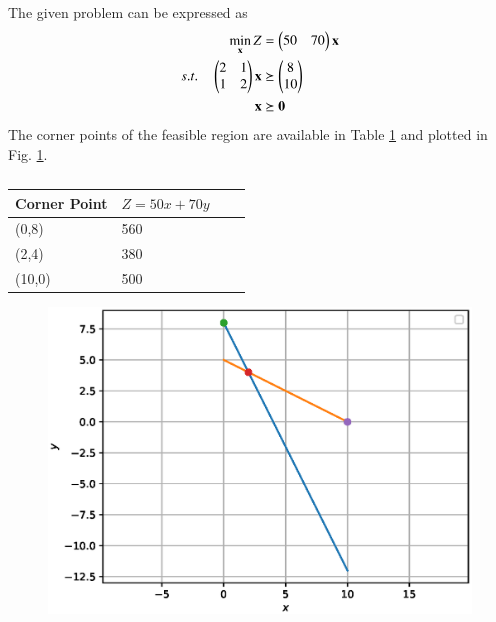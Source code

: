 \begin{enumerate}[label=\arabic*.,ref=\thesection.\theenumi]
\begin{table}[!h]
\end{table}
%
The given problem can be expressed as
\begin{align}
\min_{\mathbf{x}} Z &= \begin{pmatrix}50 & 70\end{pmatrix}\mathbf{x}
\\
s.t. \quad 
\begin{pmatrix}
2 & 1
\\
1 & 2
\end{pmatrix}
\mathbf{x} & \succeq \begin{pmatrix}8\\10\end{pmatrix}
\\
\mathbf{x} &\succeq \mathbf{0}
\label{eq:diet}
\end{align}
%
The corner points of the feasible region are available in Table \ref{table:diet_corner_pt} and plotted in Fig. \ref{fig:diet}.
%
\begin{table}[!h]
\begin{tabular}{|l|l|l|l|}
\hline
Corner Point &  $Z=50x+70y$\\
\hline
(0,8)& 560\\
\hline
(2,4)& 380\\
\hline
(10,0)& 500\\
\hline
\end{tabular}
\caption{}
\label{table:diet_corner_pt}
\end{table}
  \begin{figure}[!h]

  \centering
  \includegraphics[width=1\linewidth]{./figs/lp_diet.eps}
\caption{}
\label{fig:diet}
  \end{figure}



\end{enumerate}
